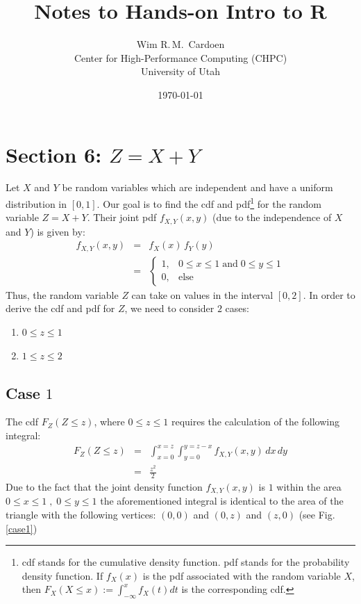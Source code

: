 \documentclass[12pt]{article}
\title{Notes to Hands-on Intro to R}
\author{Wim R.\,M.\, Cardoen\\
        Center for High-Performance Computing (CHPC)\\
        University of Utah}
\theoremstyle{definition}
\theoremstyle{remark}
\begin{document}
\date{\today}
\maketitle
\thispagestyle{empty}
\pagestyle{plain}
\setcounter{page}{1}
\renewcommand{\thesection}{\Roman{section}}

\section*{Section 6: $Z=X+Y$}
Let $X$ and $Y$ be random variables which are independent and have a uniform distribution in $[0,1]$.
Our goal is to find the cdf and pdf\footnote{cdf stands for the cumulative density function. pdf stands for the probability density function. 
If $f_X(x)$ is the pdf associated with the random variable $X$, then $F_X(X\le x):= \int_{-\infty}^x f_X(t) dt$ is the corresponding cdf.} for the random variable $Z=X+Y$. \newline
Their joint pdf $f_{X,Y}(x,y)$ (due to the independence of $X$ and $Y$) is given by:
\begin{eqnarray}
	f_{X,Y}(x,y) & = &f_X(x)\,f_Y(y) \nonumber \\
		     & = & \begin{cases}
			 1, & 0\le x \le 1\; \text{and} \;0\le y \le 1 \nonumber  \\
			     0, & \text{else}
		     \end{cases}    
\end{eqnarray}	
Thus, the random variable $Z$ can take on values in the interval $[0,2]$.
In order to derive the cdf and pdf for $Z$, we need to consider $2$ cases:
\begin{enumerate}
    \item $0\le z \le 1$
    \item $1 \le z \le 2$	    
\end{enumerate}		

\subsection*{Case $1$}
The cdf $F_Z(Z\le z)$, where $0\le z \le 1$ requires 
the calculation of the following integral:
\begin{eqnarray}
        F_Z(Z \le z) &= & \int_{x=0}^{x=z} \int_{y=0}^{y=z-x} f_{X,Y}(x,y)\,dx\,dy \nonumber \\
              & =& \frac{z^2}{2} \nonumber
\end{eqnarray} 
Due to the fact that the joint density function $f_{X,Y}(x,y)$ is $1$ within the area $0\le x \le 1\; , \;0\le y \le 1$ the 
aforementioned integral is identical to the area of the triangle with the following vertices:
$(0,0)$ and $(0,z)$ and $(z,0)$ (see Fig.\,\ref{case1})
\end{document}
